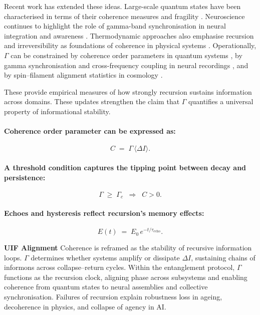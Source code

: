 Recent work has extended these ideas. Large-scale quantum states have been characterised in terms of their coherence measures and fragility \cite{Frowis2018}. Neuroscience continues to highlight the role of gamma-band synchronisation in neural integration and awareness \cite{Singer2018}. Thermodynamic approaches also emphasise recursion and irreversibility as foundations of coherence in physical systems \cite{Gyftopoulos2021}. Operationally, $\Gamma$ can be constrained by coherence order parameters in quantum systems \cite{Frowis2018}, by gamma synchronisation and cross-frequency coupling in neural recordings \cite{Singer2018}, and by spin–filament alignment statistics in cosmology \cite{Wang2025}.

These provide empirical measures of how strongly recursion sustains information across domains. These updates strengthen the claim that $\Gamma$ quantifies a universal property of informational stability.
\newline


\paragraph{Coherence order parameter can be expressed as:}
\begin{equation}
\label{eq:612}
C \;=\; \Gamma\,\langle \Delta I \rangle.
\end{equation}

\paragraph{A threshold condition captures the tipping point between decay and persistence:}
\begin{equation}
\label{eq:613}
\Gamma \;\ge\; \Gamma_c \;\;\Rightarrow\;\; C>0.
\end{equation}

\paragraph{Echoes and hysteresis reflect recursion’s memory effects:}
\begin{equation}
\label{eq:614}
E(t) \;=\; E_0\, e^{-t/\tau_{\text{echo}}}.
\end{equation}

\noindent
\textbf{UIF Alignment} 
\newline Coherence is reframed as the stability of recursive information loops. $\Gamma$ determines whether systems amplify or dissipate $\Delta I$, sustaining chains of informons across collapse–return cycles. Within the entanglement protocol, $\Gamma$ functions as the recursion clock, aligning phase across subsystems and enabling coherence from quantum states to neural assemblies and collective synchronisation. Failures of recursion explain robustness loss in ageing, decoherence in physics, and collapse of agency in AI.
\newline

